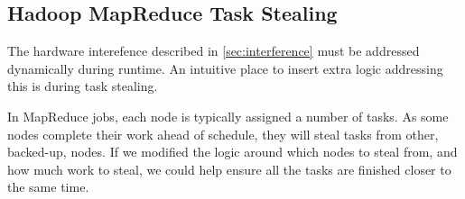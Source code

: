 \subsection{Hadoop MapReduce Task Stealing}
The hardware interefence described in \ref{sec:interference} must be addressed dynamically
during runtime. An intuitive place to insert extra logic addressing this is during task
stealing.

In MapReduce jobs, each node is typically assigned a number of tasks. As some nodes 
complete their work ahead of schedule, they will steal tasks from other, backed-up,
nodes. If we modified the logic around which nodes to steal from, and how much work
to steal, we could help ensure all the tasks are finished closer to the same time.

